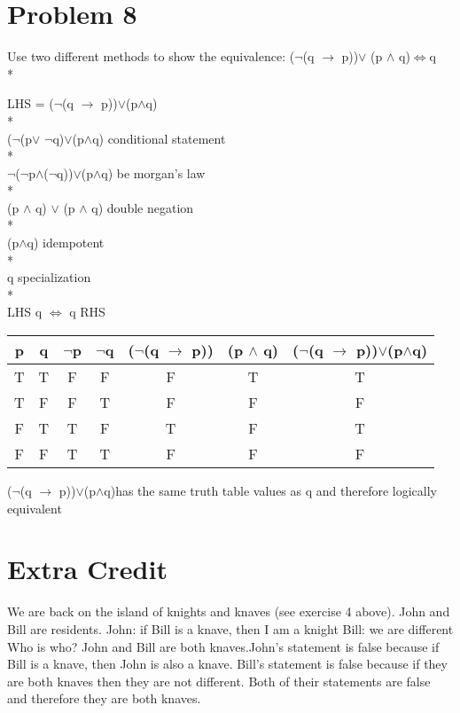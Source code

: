 \documentclass[11pt]{article}
\begin{document}
	\section*{Problem 8}
	Use two different methods to show the equivalence:
	($\neg$(q $\rightarrow$ p))$\vee$ (p $\wedge$ q)$\Leftrightarrow$q\\*\\
	

	\begin{center}
	LHS = ($\neg$(q $\rightarrow$ p))$\vee$(p$\wedge$q)\\*\\
	 ($\neg$(p$\vee$ $\neg$q)$\vee$(p$\wedge$q) conditional statement\\*\\
	 $\neg$($\neg$p$\wedge$($\neg$q))$\vee$(p$\wedge$q) be morgan's law \\*\\
	 (p $\wedge$ q) $\vee$ (p $\wedge$ q) double negation \\*\\
	 (p$\wedge$q) idempotent \\*\\
	 q specialization\\*\\
	 LHS q $\Leftrightarrow$ q RHS
	\end{center}
	
				\begin{center}
					\begin{tabular}{||c | c | c | c | c | c | c ||}					\hline
						p & q & $\neg$p & $\neg$q & ($\neg$(q $\rightarrow$ p))& (p $\wedge$ q) & ($\neg$(q $\rightarrow$ p))$\vee$(p$\wedge$q)\\
						[0.5ex]
						\hline\hline
						T & T & F & F & F & T & T \\
						\hline		
						T & F & F & T & F & F & F \\
						\hline
						F & T & T & F & T & F & T \\
						\hline
						F & F & T & T & F & F & F \\
						\hline			
					\end{tabular}
				\newline
					($\neg$(q $\rightarrow$ p))$\vee$(p$\wedge$q)has the same truth table values as q and therefore logically equivalent
				\end{center}
	\section*{Extra Credit}
	We are back on the island of knights and knaves (see exercise 4 above). John and Bill are
	residents.
	John: if Bill is a knave, then I am a knight
	Bill: we are different
	Who is who?
	\newline\newline
	John and Bill are both knaves.\newline John's statement is false because if Bill is a knave, then John is also a knave. Bill's statement is false because if they are both knaves then they are not different. Both of their statements are false and therefore they are both knaves.
\end{document}

